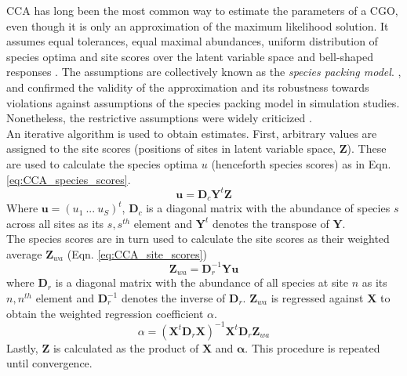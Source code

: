 		CCA has long been the most common way to estimate the parameters of a CGO, even though it is only an approximation of the maximum likelihood solution. 
		It assumes equal tolerances, equal maximal abundances, uniform distribution of species optima and site scores over the latent variable space and bell-shaped responses \citep{TerBraak1986}. 
		The assumptions are collectively known as the \textit{species packing model}. 
		\citet{Palmer1993}, \citet{Johnson1999} and \citet{Zuur1999} confirmed the validity of the approximation and its robustness towards violations against assumptions of the species packing model in simulation studies.
		Nonetheless, the restrictive assumptions were widely criticized \citep[e.g.][]{Austin1994}. \\
		An iterative algorithm is used to obtain estimates. First, arbitrary values are assigned to the site scores (positions of sites in latent variable space, $\mathbf{Z}$). 
		These are used to calculate the species optima  $u$ (henceforth species scores) as in Eqn. \ref{eq:CCA_species_scores}.
		\begin{equation}\label{eq:CCA_species_scores}
		\mathbf{u} = \mathbf{D}_c \mathbf{Y}^t \mathbf {Z}
		\end{equation}
		Where $\mathbf{u} = (u_1\ ...\ u_S)^t$, $\mathbf{D}_c$ is a diagonal matrix with the abundance of species $s$ across all sites as its $s,s^{th}$ element and $\mathbf{Y}^t$ denotes the transpose of $\mathbf{Y}$.\\
		The species scores are in turn used to calculate the site scores as their weighted average $\mathbf{Z}_{wa}$ (Eqn. \ref{eq:CCA_site_scores}) 
		\begin{equation} \label{eq:CCA_site_scores}
			\mathbf{Z}_{wa} = \mathbf{D}_r^{-1} \mathbf{Y} \mathbf {u}
		\end{equation}
		where $\mathbf{D}_r$ is a diagonal matrix with the abundance of all species at site $n$ as its $n,n^{th}$ element and $\mathbf{D}_r^{-1}$ denotes the inverse of $\mathbf{D}_r$. 
		$\mathbf{Z}_{wa}$ is regressed against $\mathbf{X}$ to obtain the weighted regression coefficient $\alpha$. 
		\begin{equation}\label{CCA_canocical_weights}
		\alpha = (\mathbf{X}^t \mathbf{D}_r \mathbf{X})^{-1} \mathbf{X}^t \mathbf{D}_r \mathbf{Z}_{wa}
		\end{equation}
		Lastly, $\mathbf{Z}$ is calculated as the product of $\mathbf{X}$ and $\mathbf{\alpha}$. 
		This procedure is repeated until convergence. \\
	    
